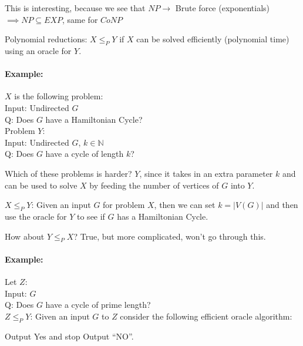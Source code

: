 \documentclass[12 pt]{article}
\begin{document}
          This is interesting, because we see that $NP \rightarrow$
          Brute force (exponentials)
          \\ $\implies NP \subseteq EXP$, same for $CoNP$

          Polynomial reductions: $X \leq_P Y$ if $X$ can be solved
          efficiently (polynomial time) using an oracle for $Y$.
          \paragraph{Example:} $X$ is the following problem:
          \\ Input: Undirected $G$
          \\ Q: Does $G$ have a Hamiltonian Cycle?
          \\ Problem $Y$:
          \\ Input: Undirected $G$, $k \in \mathbb{N}$
          \\ Q: Does $G$ have a cycle of length $k$?

          Which of these problems is harder? $Y$, since it takes in
          an extra parameter $k$ and can be used to solve $X$ by feeding the
          number of vertices of $G$ into $Y$.

          $X \leq_P Y$: Given an input $G$ for problem $X$, then we
          can set $k = \left|V(G)\right|$ and then use the oracle for
          $Y$ to see if $G$ has a Hamiltonian Cycle.

          How about $Y \leq_P X$? True, but more complicated, won't
          go through this.

          \paragraph{Example:} Let $Z$:
          \\ Input: $G$
          \\ Q: Does $G$ have a cycle of prime length?
          \\ $Z \leq_P Y$: Given an input $G$ to $Z$ consider the
          following efficient oracle algorithm:
          \begin{algorithmic}
                     Output Yes
                    and stop
                    \EndIf
                \EndIf    
            \EndFor    
            \State Output ``NO''.
          \end{algorithmic}
\end{document}
